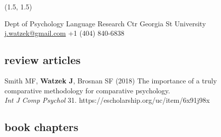 \documentclass[]{friggeri-cv}
\begin{document}
\renewenvironment{aside}{%
  \let\oldsection\section
  \renewcommand{\section}[1]{
    \par\vspace{\baselineskip}{\Large\headingfont\color{headercolor} ##1}
  }
  \begin{textblock}{3.6}(1.5, 1.5)
  \begin{flushright}
  \obeycr
}{%
  \restorecr
  \end{flushright}
  \end{textblock}
  \let\section\oldsection
}


\begin{aside}
  \section{{\normalfont julia}watzek}
    Dept of Psychology
    Language Research Ctr
    Georgia St University
    ~
    \href{mailto:j.watzek@gmail.com}{j.watzek@gmail.com}
    +1 (404) 840-6838
\end{aside}


\subsection{review articles}

\begin{enumerate}[resume, label={[\,\arabic*\,]}]
  \item {Smith MF, \textbf{Watzek J}, Brosnan SF (2018) The importance of a truly comparative methodology for comparative psychology. \\\emph{Int J Comp Psychol} 31. https://escholarship.org/uc/item/6x91j98x}
\end{enumerate}


\subsection{book chapters}
\end{document}
